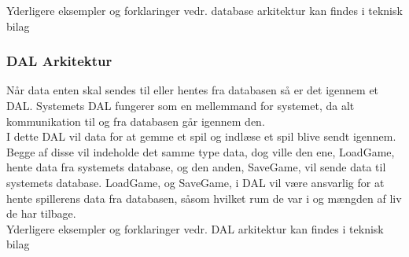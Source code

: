 \noindent Yderligere eksempler og forklaringer vedr. database arkitektur kan findes i teknisk bilag \parencite[][Section 7.5]{TekniskBilag}

\subsubsection{DAL Arkitektur}
Når data enten skal sendes til eller hentes fra databasen så er det igennem et DAL. Systemets DAL fungerer som en mellemmand for systemet, da alt kommunikation til og fra databasen går igennem den.\\
\noindent I dette DAL vil data for at gemme et spil og indlæse et spil blive sendt igennem. Begge af disse vil indeholde det samme type data, dog ville den ene, LoadGame, hente data fra systemets database, og den anden, SaveGame, vil sende data til systemets database. 
LoadGame, og SaveGame, i DAL vil være ansvarlig for at hente spillerens data fra databasen, såsom hvilket rum de var i og mængden af liv de har tilbage.\\

\noindent Yderligere eksempler og forklaringer vedr. DAL arkitektur kan findes i teknisk bilag \parencite[][Section 7.6]{TekniskBilag}

